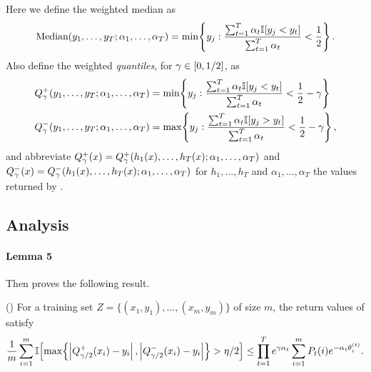 \begin{sloppypar}
Here we define the weighted median as 
\begin{equation*}
\text{Median}(y_{1},\ldots,y_{T};\alpha_{1},\ldots,\alpha_{T}) = \min\!\left\{ y_{j} : \frac{\sum_{t=1}^{T} \alpha_{t} \mathbb{I}[ y_{j} < y_{t} ] }{\sum_{t=1}^{T} \alpha_{t}} < \frac{1}{2} \right\}.
\end{equation*}
Also define the weighted \emph{quantiles}, for $\gamma \in [0,1/2]$, as 
\begin{align*}
Q_{\gamma}^{+}(y_{1},\ldots,y_{T};\alpha_{1},\ldots,\alpha_{T}) & = \min\!\left\{ y_{j} : \frac{\sum_{t=1}^{T} \alpha_{t} \mathbb{I}[ y_{j} < y_{t} ] }{\sum_{t=1}^{T} \alpha_{t}} < \frac{1}{2} - \gamma \right\}
\\ Q_{\gamma}^{-}(y_{1},\ldots,y_{T};\alpha_{1},\ldots,\alpha_{T}) & = \max\!\left\{ y_{j} : \frac{\sum_{t=1}^{T} \alpha_{t} \mathbb{I}[ y_{j} > y_{t} ] }{\sum_{t=1}^{T} \alpha_{t}} < \frac{1}{2} - \gamma \right\},
\end{align*}
and abbreviate $Q_{\gamma}^{+}(x) = Q_{\gamma}^{+}(h_{1}(x),\ldots,h_{T}(x);\alpha_{1},\ldots,\alpha_{T})$ and $Q_{\gamma}^{-}(x) = Q_{\gamma}^{-}(h_{1}(x),\ldots,h_{T}(x);\alpha_{1},\ldots,\alpha_{T})$ 
for $h_{1},\ldots,h_{T}$ and $\alpha_{1},\ldots,\alpha_{T}$ the values returned by .
\end{sloppypar}


    


\subsection{Analysis}

\paragraph{Lemma 5} %


Then \citet{kegl2003robust} proves the following result.

\begin{lemma}
\label{lem:kegl}
(\citet{kegl2003robust}) 
For a training set $Z = \{(x_{1},y_{1}),\ldots,(x_{m},y_{m})\}$ of size $m$, 
the return values of  satisfy 
\begin{equation*}
\frac{1}{m} \sum_{i=1}^{m} \mathbb{I}\!\left[ \max\!\left\{ \left| Q_{\gamma/2}^{+}(x_{i}) - y_{i} \right|, \left| Q_{\gamma/2}^{-}(x_{i}) - y_{i} \right| \right\} > \eta/2 \right] 
\leq \prod_{t=1}^{T} e^{\gamma \alpha_{t}} \sum_{i=1}^{m} P_{t}(i) e^{-\alpha_{t} \theta_{i}^{(t)}}.
\end{equation*}
\end{lemma}

